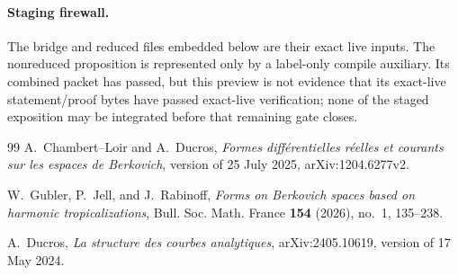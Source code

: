 \documentclass[11pt]{article}
\theoremstyle{definition}
\theoremstyle{remark}
\begin{document}
\paragraph{Staging firewall.}
The bridge and reduced files embedded below are their exact live inputs.
The nonreduced proposition is represented only by a label-only compile
auxiliary.  Its combined packet has passed, but this preview is not evidence
that its exact-live statement/proof bytes have passed exact-live verification;
none of the staged exposition may be integrated before that remaining gate
closes.















\begin{thebibliography}{99}
A.~Chambert--Loir and A.~Ducros,
\emph{Formes diff\'erentielles r\'eelles et courants sur les espaces de
Berkovich}, version of 25 July 2025, arXiv:1204.6277v2.

W.~Gubler, P.~Jell, and J.~Rabinoff,
\emph{Forms on Berkovich spaces based on harmonic tropicalizations},
Bull. Soc. Math. France \textbf{154} (2026), no.~1, 135--238.

A.~Ducros,
\emph{La structure des courbes analytiques},
arXiv:2405.10619, version of 17 May 2024.
\end{thebibliography}
\end{document}
